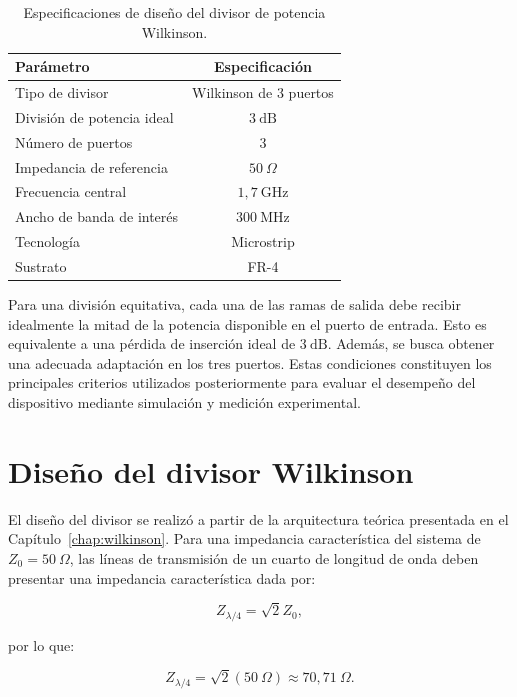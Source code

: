 \begin{table}[H]
\centering
\begin{tabular}{lc}
\hline
\textbf{Parámetro} & \textbf{Especificación} \\
\hline
Tipo de divisor & Wilkinson de 3 puertos \\
División de potencia ideal & $3~\mathrm{dB}$ \\
Número de puertos & 3 \\
Impedancia de referencia & $50~\Omega$ \\
Frecuencia central & $1{,}7~\mathrm{GHz}$ \\
Ancho de banda de interés & $300~\mathrm{MHz}$ \\
Tecnología & Microstrip \\
Sustrato & FR-4 \\
\hline
\end{tabular}
\caption{Especificaciones de diseño del divisor de potencia Wilkinson.}
\label{tab:especificaciones_wilkinson}
\end{table}

Para una división equitativa, cada una de las ramas de salida debe recibir idealmente la mitad de la potencia disponible en el puerto de entrada. Esto es equivalente a una pérdida de inserción ideal de $3~\mathrm{dB}$. Además, se busca obtener una adecuada adaptación en los tres puertos. Estas condiciones constituyen los principales criterios utilizados posteriormente para evaluar el desempeño del dispositivo mediante simulación y medición experimental.

\section{Diseño del divisor Wilkinson}

El diseño del divisor se realizó a partir de la arquitectura teórica presentada en el Capítulo~\ref{chap:wilkinson}. Para una impedancia característica del sistema de $Z_0 = 50~\Omega$, las líneas de transmisión de un cuarto de longitud de onda deben presentar una impedancia característica dada por:

\begin{equation}
    Z_{\lambda/4} = \sqrt{2}Z_0,
\end{equation}

por lo que:

\begin{equation}
    Z_{\lambda/4} = \sqrt{2}(50~\Omega) \approx 70{,}71~\Omega.
\end{equation}

